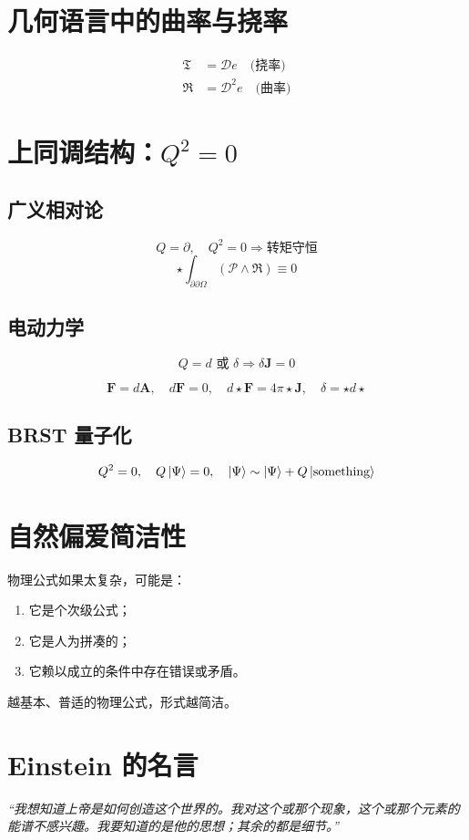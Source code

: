 \documentclass{article}
\begin{document}
\section{几何语言中的曲率与挠率}
\begin{align*}
  \mathfrak{T} &= \mathscr{D} e \quad \text{(挠率)} \\
  \mathfrak{R} &= \mathscr{D}^2 e \quad \text{(曲率)}
\end{align*}

\section{上同调结构：$Q^2 = 0$}
\subsection*{广义相对论}
\[ Q = \partial, \quad Q^2 = 0 \Rightarrow \text{转矩守恒} \]
\[ \star \int_{\partial\partial \Omega}(\mathscr{P} \wedge \mathfrak{R}) \equiv 0 \]

\subsection*{电动力学}
\[ Q = d \text{ 或 } \delta \Rightarrow \delta \boldsymbol{J} = 0 \]

\[ \boldsymbol{F} = d\boldsymbol{A}, \quad d\boldsymbol{F} = 0, \quad d\star \boldsymbol{F} = 4\pi \star \boldsymbol{J}, \quad \delta = \star d\star \]


\subsection*{BRST 量子化}
\[ Q^2 = 0, \quad Q\ket{\Psi} = 0, \quad \ket{\Psi} \sim \ket{\Psi} + Q\ket{\text{something}} \]

\section{自然偏爱简洁性}
物理公式如果太复杂，可能是：
\begin{enumerate}
  \item 它是个次级公式；
  \item 它是人为拼凑的；
  \item 它赖以成立的条件中存在错误或矛盾。
\end{enumerate}

越基本、普适的物理公式，形式越简洁。

\section*{Einstein 的名言}
\emph{“我想知道上帝是如何创造这个世界的。我对这个或那个现象，这个或那个元素的能谱不感兴趣。我要知道的是他的思想；其余的都是细节。”}
\end{document}
